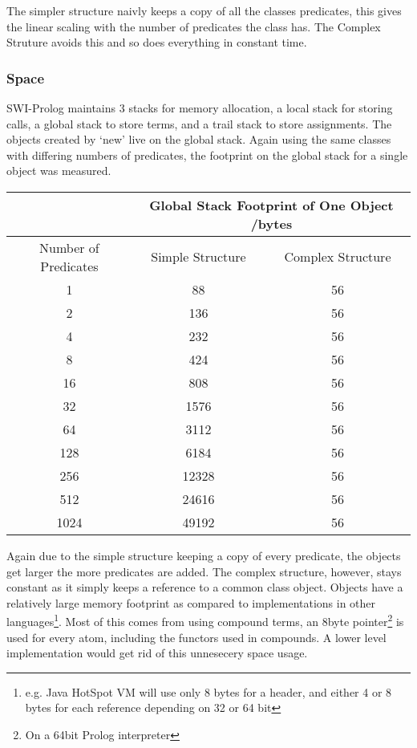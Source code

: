 \documentclass[12pt,a4paper,twoside,openright]{report}
\begin{document}
The simpler structure naivly keeps a copy of all the classes predicates, this gives the linear scaling with the number of predicates the class has. The Complex Struture avoids this and so does everything in constant time.

\subsubsection{Space}

SWI-Prolog maintains 3 stacks for memory allocation, a local stack for storing calls, a global stack to store terms, and a trail stack to store assignments. The objects created by `new' live on the global stack. Again using the same classes with differing numbers of predicates, the footprint on the global stack for a single object was measured.

\begin{center}
\begin{tabular}{c|c|c}

& \multicolumn{2}{c}{Global Stack Footprint of One Object /bytes} \\
\hline
Number of Predicates & Simple Structure & Complex Structure \\
\hline
1		&	88		&	56	\\
2		&	136		&	56	\\
4		&	232		&	56	\\
8		&	424		&	56	\\
16		&	808		&	56	\\
32		&	1576	&	56	\\
64		&	3112	&	56	\\
128		&	6184	&	56	\\
256		&	12328	&	56	\\
512		&	24616	&	56	\\
1024	&	49192	&	56	\\


\end{tabular}
\end{center}

Again due to the simple structure keeping a copy of every predicate, the objects get larger the more predicates are added. The complex structure, however, stays constant as it simply keeps a reference to a common class object. Objects have a relatively large memory footprint as compared to implementations in other languages\footnote{e.g. Java HotSpot VM will use only 8 bytes for a header, and either 4 or 8 bytes for each reference depending on 32 or 64 bit}. Most of this comes from using compound terms, an 8byte pointer\footnote{On a 64bit Prolog interpreter} is used for every atom, including the functors used in compounds. A lower level implementation would get rid of this unnesecery space usage.
\end{document}
